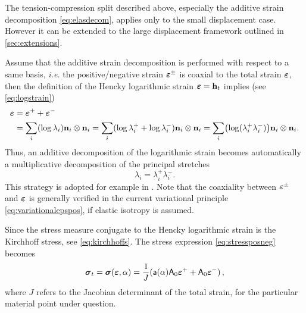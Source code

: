 \begin{remark}
The tension-compression split described above, especially the additive strain decomposition \eqref{eq:elasdecom}, applies only to the small displacement case. However it can be extended to the large displacement framework outlined in \cref{sec:extensions}.

Assume that the additive strain decomposition is performed with respect to a same basis, \emph{i.e.} the positive/negative strain $\eps^\pm$ is coaxial to the total strain $\eps$, then the definition of the Hencky logarithmic strain $\eps=\vec{h}_t$ implies (see \eqref{eq:logstrain})
\begin{align*}
\eps &= \eps^++\eps^- \\
&= \sum_i(\log\lambda_i)\vec{n}_i\otimes\vec{n}_i=\sum_i(\log\lambda_i^++\log\lambda_i^-)\vec{n}_i\otimes\vec{n}_i=\sum_i\bigl(\log(\lambda_i^+\lambda_i^-)\bigr)\vec{n}_i\otimes\vec{n}_i.
\end{align*}
Thus, an additive decomposition of the logarithmic strain becomes automatically a multiplicative decomposition of the principal stretches
\[
\lambda_i=\lambda_i^+\lambda_i^-.
\]
This strategy is adopted for example in \cite{HeschWeinberg:2014}. Note that the coaxiality between $\eps^\pm$ and $\eps$ is generally verified in the current variational principle \eqref{eq:variationalepspos}, if elastic isotropy is assumed.

Since the stress measure conjugate to the Hencky logarithmic strain is the Kirchhoff stress, see \eqref{eq:kirchhoffs}. The stress expression \eqref{eq:stressposneg} becomes
\[
\sig_t=\sig(\eps,\alpha)=\frac{1}{J}(\mathsf{a}(\alpha)\tens{A}_0\eps^++\tens{A}_0\eps^-)\,,
\]
where $J$ refers to the Jacobian determinant of the total strain, for the particular material point under question.
\end{remark}

